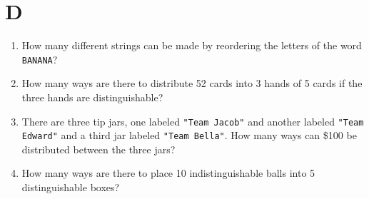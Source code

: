 \section*{D}
\begin{enumerate}
\item
How many different strings can be made by reordering the letters of the word \texttt{BANANA}?

\item
How many ways are there to distribute 52 cards into 3 hands of 5 cards if the three hands are distinguishable?


\item
There are three tip jars, one labeled \texttt{"Team Jacob"} and another labeled \texttt{"Team Edward"}
and a third jar labeled \texttt{"Team Bella"}.
How many ways can \$100 be distributed between the three jars?
\item
How many ways are there to place 10 indistinguishable balls into 5 distinguishable boxes?

\end{enumerate}
